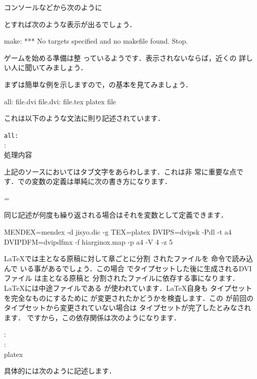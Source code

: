 コンソールなどから次のように
\begin{InTerm}
\end{InTerm}
とすれば次のような表示が出るでしょう．

\begin{OutTerm}
make: *** No targets specified and no makefile found.  Stop.
\end{OutTerm}

ゲームを始める準備は整
っているようです．表示されないならば，近くの
詳しい人に聞いてみましょう．

まずは簡単な例を示しますので，の基本を見てみましょう．

\begin{Makefile}
all: file.dvi
file.dvi: file.tex
	platex file
\end{Makefile}

これは以下のような文法に則り記述されています．
\begin{Syntax}
\verb|all:| \\
: \\
\MakeTabSkip 処理内容
\end{Syntax}
上記のソースにおいて\qu{\MakeTabSkip}はタブ文字をあらわします．これは非
常に重要な点です．での変数の定義は単純に次の書き方になります．

\begin{Syntax}
\str=
\end{Syntax}

同じ記述が何度も繰り返される場合はそれを変数として定義できます．

\begin{Makefile}
MENDEX=mendex -d jisyo.dic -g
TEX=platex 
DVIPS=dvipsk -Pdl -t a4
DVIPDFM=dvipdfmx -f hiarginox.map -p a4 -V 4 -z 5
\end{Makefile}

{\LaTeX}では主となる原稿に対して章ごとに分割
されたファイルを 命令で読み込んで
いる事があるでしょう．この場合\prog{\LaTeX}
でタイプセットした後に生成されるDVIファイル
は主となる原稿と
分割されたファイルに依存する事になります．
{\LaTeX}には中途ファイルである
が使われています．{\LaTeX}自身も
タイプセットを完全なものにするために
が変更されたかどうかを検査します．この
が前回のタイプセットから変更されていない場合は
タイプセットが完了したとみなされます．
ですから，この依存関係は次のようになります．
\begin{Syntax}
: \\
: \\
\MakeTabSkip platex 
\end{Syntax}
具体的には次のように記述します．

